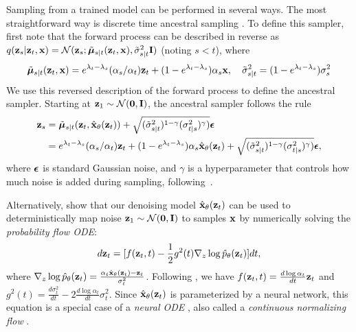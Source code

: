 \documentclass[hidelinks]{article} %
\begin{document}
Sampling from a trained model can be performed in several ways. The most straightforward way is discrete time ancestral sampling \citep{ho2020denoising}. To define this sampler, first note that the forward process can be described in reverse as $q(\mathbf{z}_s|\mathbf{z}_t,\mathbf{x}) = \mathcal{N}(\mathbf{z}_s; \tilde{{\boldsymbol{\mu}}}_{s|t}(\mathbf{z}_t,\mathbf{x}), \tilde\sigma^2_{s|t}\mathbf{I})$ (noting $s < t$), where
\begin{align}
\tilde{{\boldsymbol{\mu}}}_{s|t}(\mathbf{z}_t,\mathbf{x}) = e^{\lambda_t-\lambda_s}(\alpha_s/\alpha_t)\mathbf{z}_t + (1-e^{\lambda_t-\lambda_s})\alpha_s\mathbf{x}, \quad
\tilde\sigma^2_{s|t} = (1-e^{\lambda_t-\lambda_s})\sigma_s^2
\end{align}
We use this reversed description of the forward process to define the ancestral sampler. Starting at $\mathbf{z}_1 \sim \mathcal{N}(\mathbf{0}, \mathbf{I})$, the ancestral sampler follows the rule
\begin{align}
    \mathbf{z}_s &= \tilde{{\boldsymbol{\mu}}}_{s|t}(\mathbf{z}_t, \hat{\mathbf{x}}_\theta(\mathbf{z}_t)) + \sqrt{(\tilde\sigma^2_{s|t})^{1-\gamma} (\sigma^2_{t|s})^\gamma)}{\boldsymbol{\epsilon}} \\
    &= e^{\lambda_t-\lambda_s}(\alpha_s/\alpha_t)\mathbf{z}_t + (1-e^{\lambda_t-\lambda_s})\alpha_s\hat{\mathbf{x}}_\theta(\mathbf{z}_t) + \sqrt{(\tilde\sigma^2_{s|t})^{1-\gamma} (\sigma^2_{t|s})^\gamma)}{\boldsymbol{\epsilon}},
\label{eq:ancestral}
\end{align}
where ${\boldsymbol{\epsilon}}$ is standard Gaussian noise, and $\gamma$ is a hyperparameter that controls how much noise is added during sampling, following~\citet{nichol2021improvedddpm}.

Alternatively, \citet{song2020score} show that our denoising model $\hat{\mathbf{x}}_\theta(\mathbf{z}_t)$ can be used to deterministically map noise $\mathbf{z}_1 \sim \mathcal{N}(\mathbf{0}, \mathbf{I})$ to samples ${\mathbf{x}}$ by numerically solving the \emph{probability flow ODE}:
\begin{align}
\label{eq:probflowode}
d{\mathbf{z}}_t = [f({\mathbf{z}}_t, t) - \frac{1}{2}g^{2}(t)\nabla_{z}\log \hat{p}_{\theta}({\mathbf{z}}_t) ]dt,
\end{align}
where $\nabla_{z}\log \hat{p}_{\theta}({\mathbf{z}}_t) = \frac{\alpha_{t}\hat{{\mathbf{x}}}_{\theta}({\mathbf{z}}_t) - {\mathbf{z}}_t}{\sigma^{2}_t}$.
Following \cite{kingma2021variational}, we have $f({\mathbf{z}}_t, t) = \frac{d \log\alpha_t}{dt}{\mathbf{z}}_t$ and $g^2(t) = \frac{d\sigma^{2}_t}{dt} - 2\frac{d \log\alpha_t}{dt}\sigma^{2}_t$.
Since $\hat{\mathbf{x}}_\theta(\mathbf{z}_t)$ is parameterized by a neural network, this equation is a special case of a \emph{neural ODE} \citep{chen2018neural}, also called a \emph{continuous normalizing flow} \citep{grathwohl2018ffjord}.
\end{document}
